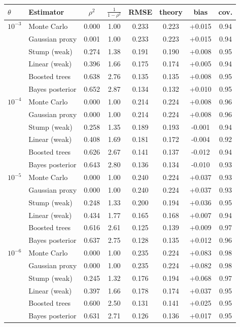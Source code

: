 \begin{tabular*}{\columnwidth}{@{\extracolsep{\fill}}llcccccc@{}}
\toprule
$\theta$ & Estimator & $\rho^2$ & $\frac{1}{1-\rho^2}$ & RMSE & theory & bias & cov.\\
\midrule
$10^{-3}$ & Monte Carlo & 0.000 & 1.00 & 0.233 & 0.223 & +0.015 & 0.94\\
 & Gaussian proxy & 0.001 & 1.00 & 0.233 & 0.223 & +0.015 & 0.94\\
 & Stump (weak) & 0.274 & 1.38 & 0.191 & 0.190 & +0.008 & 0.95\\
 & Linear (weak) & 0.396 & 1.66 & 0.175 & 0.174 & +0.005 & 0.94\\
 & Boosted trees & 0.638 & 2.76 & 0.135 & 0.135 & +0.008 & 0.95\\
 & Bayes posterior & 0.652 & 2.87 & 0.134 & 0.132 & +0.010 & 0.95\\
\midrule
$10^{-4}$ & Monte Carlo & 0.000 & 1.00 & 0.214 & 0.224 & +0.008 & 0.96\\
 & Gaussian proxy & 0.000 & 1.00 & 0.214 & 0.224 & +0.008 & 0.96\\
 & Stump (weak) & 0.258 & 1.35 & 0.189 & 0.193 & -0.001 & 0.94\\
 & Linear (weak) & 0.408 & 1.69 & 0.181 & 0.172 & -0.004 & 0.92\\
 & Boosted trees & 0.626 & 2.67 & 0.141 & 0.137 & -0.012 & 0.94\\
 & Bayes posterior & 0.643 & 2.80 & 0.136 & 0.134 & -0.010 & 0.93\\
\midrule
$10^{-5}$ & Monte Carlo & 0.000 & 1.00 & 0.240 & 0.224 & +0.037 & 0.93\\
 & Gaussian proxy & 0.000 & 1.00 & 0.240 & 0.224 & +0.037 & 0.93\\
 & Stump (weak) & 0.248 & 1.33 & 0.200 & 0.194 & +0.036 & 0.95\\
 & Linear (weak) & 0.434 & 1.77 & 0.165 & 0.168 & +0.007 & 0.94\\
 & Boosted trees & 0.616 & 2.61 & 0.125 & 0.139 & +0.009 & 0.97\\
 & Bayes posterior & 0.637 & 2.75 & 0.128 & 0.135 & +0.012 & 0.96\\
\midrule
$10^{-6}$ & Monte Carlo & 0.000 & 1.00 & 0.235 & 0.224 & +0.083 & 0.98\\
 & Gaussian proxy & 0.000 & 1.00 & 0.235 & 0.224 & +0.082 & 0.98\\
 & Stump (weak) & 0.245 & 1.32 & 0.176 & 0.194 & +0.068 & 0.97\\
 & Linear (weak) & 0.397 & 1.66 & 0.178 & 0.174 & +0.037 & 0.95\\
 & Boosted trees & 0.600 & 2.50 & 0.131 & 0.141 & +0.025 & 0.95\\
 & Bayes posterior & 0.631 & 2.71 & 0.126 & 0.136 & +0.017 & 0.95\\
\bottomrule
\end{tabular*}
